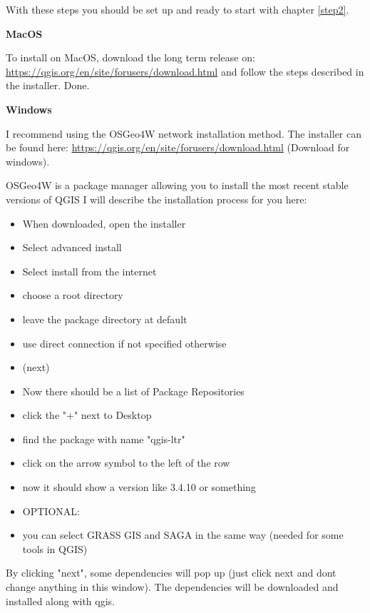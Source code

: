 \documentclass[12pt,a4paper]{scrartcl}
\begin{document}
With these steps you should be set up and ready to start with chapter \ref{step2}. \newline

\textbf{MacOS} \newline

To install on MacOS, download the long term release on:
\url{https://qgis.org/en/site/forusers/download.html} and follow the steps described in the installer. Done.\newline

\textbf{Windows} \newline

I recommend using the OSGeo4W network installation method. \newline
The installer can be found here: \url{https://qgis.org/en/site/forusers/download.html} (Download for windows).

OSGeo4W is a package manager allowing you to install the most recent stable versions of QGIS
I will describe the installation process for you here: \newline

\begin{itemize}
	\item When downloaded, open the installer
	\item Select advanced install
	\item Select install from the internet
	\item choose a root directory 
	\item leave the package directory at default
	\item use direct connection if not specified otherwise
	\item (next)
	\item Now there should be a list of Package Repositories
	\item click the "+" next to Desktop
	\item find the package with name "qgis-ltr"
	\item click on the arrow symbol to the left of the row
	\item now it should show a version like 3.4.10 or something
	\item OPTIONAL: 
	\item you can select GRASS GIS and SAGA in the same way (needed for some tools in QGIS)
\end{itemize}

By clicking "next", some dependencies will pop up (just click next and dont change anything in this window).
The dependencies will be downloaded and installed along with qgis.\newline
\end{document}
